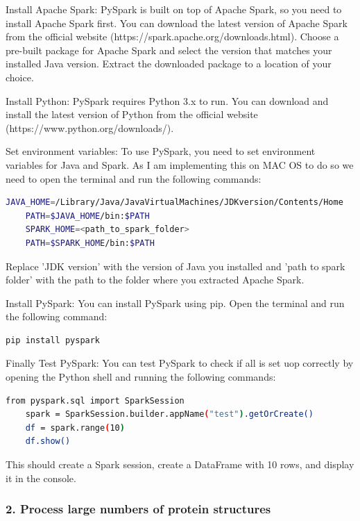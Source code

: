 \documentclass[]{final_report}
\begin{document}
Install Apache Spark: PySpark is built on top of Apache Spark, so you need to install Apache Spark first. You can download the latest version of Apache Spark from the official website (https://spark.apache.org/downloads.html). Choose a pre-built package for Apache Spark and select the version that matches your installed Java version. Extract the downloaded package to a location of your choice.

Install Python: PySpark requires Python 3.x to run. You can download and install the latest version of Python from the official website (https://www.python.org/downloads/).

Set environment variables: To use PySpark, you need to set environment variables for Java and Spark. As I am implementing this on MAC OS to do so we need to open the terminal and run the following commands:

\begin{lstlisting}[language=bash]
    JAVA_HOME=/Library/Java/JavaVirtualMachines/JDKversion/Contents/Home
    PATH=$JAVA_HOME/bin:$PATH
    SPARK_HOME=<path_to_spark_folder>
    PATH=$SPARK_HOME/bin:$PATH
\end{lstlisting}

Replace 'JDK version' with the version of Java you installed and 'path to spark folder' with the path to the folder where you extracted Apache Spark.

Install PySpark: You can install PySpark using pip. Open the terminal and run the following command:

\begin{lstlisting}[language=bash]
    pip install pyspark
\end{lstlisting}

Finally Test PySpark: You can test PySpark to check if all is set uop correctly by opening the Python shell and running the following commands:

\begin{lstlisting}[language=bash]
    from pyspark.sql import SparkSession
    spark = SparkSession.builder.appName("test").getOrCreate()
    df = spark.range(10)
    df.show()
\end{lstlisting}

This should create a Spark session, create a DataFrame with 10 rows, and display it in the console.

\clearpage

\subsubsection{2. Process large numbers of protein structures}
\end{document}
